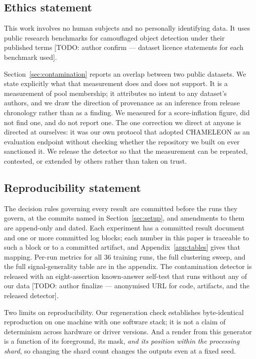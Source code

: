\documentclass{article} %
\begin{document}
\subsection*{Ethics statement}

This work involves no human subjects and no personally identifying data. It uses public research
benchmarks for camouflaged object detection under their published terms
[TODO: author confirm --- dataset licence statements for each benchmark used].

Section~\ref{sec:contamination} reports an overlap between two public datasets. We state explicitly
what that measurement does and does not support. It is a measurement of pool membership; it attributes
no intent to any dataset's authors, and we draw the direction of provenance as an inference from
release chronology rather than as a finding. We measured for a score-inflation figure, did not find
one, and do not report one. The one correction we direct at anyone is directed at ourselves: it was
our own protocol that adopted CHAMELEON as an evaluation endpoint without checking whether the
repository we built on ever sanctioned it. We release the detector so that the measurement can be
repeated, contested, or extended by others rather than taken on trust.

\subsection*{Reproducibility statement}

The decision rules governing every result are committed before the runs they govern, at the commits
named in Section~\ref{sec:setup}, and amendments to them are append-only and dated. Each experiment
has a committed result document and one or more committed log blocks; each number in this paper is
traceable to such a block or to a committed artifact, and Appendix~\ref{app:tables} gives that
mapping. Per-run metrics for all $36$ training runs, the full clustering sweep, and the full
signal-generality table are in the appendix. The contamination detector is released with an
eight-assertion known-answer self-test that runs without any of our data
[TODO: author finalize --- anonymised URL for code, artifacts, and the released detector].

Two limits on reproducibility. Our regeneration check
establishes byte-identical reproduction on one machine with one software stack; it is not a claim of
determinism across hardware or driver versions. And a render from this generator is a function of its
foreground, its mask, \emph{and its position within the processing shard}, so changing the shard count
changes the outputs even at a fixed seed.
\end{document}
